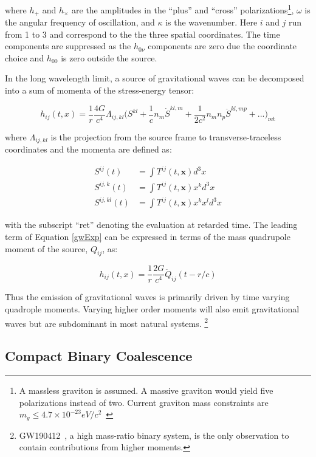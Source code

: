 \documentclass [12pt, proquest]{uwthesis}[2019]
\begin{document}
where $h_+$ and $h_\times$ are the amplitudes in the ``plus'' and ``cross'' polarizations\footnote{A massless graviton is assumed. A massive graviton would yield five polarizations instead of two. Current graviton mass constraints are $m_g\leq 4.7\times 10^{-23} eV/c^2$~\cite{graviton}}, $\omega$ is the angular frequency of oscillation, and $\kappa$ is the wavenumber. Here $i$ and $j$ run from 1 to 3 and correspond to the the three spatial coordinates. The time components are suppressed as the $h_{0\nu}$ components are zero due the coordinate choice and $h_{00}$ is zero outside the source. 

In the long wavelength limit, a source of gravitational waves can be decomposed into a sum of momenta of the stress-energy tensor:

\begin{equation}
h_{ij}(t,x)=\frac{1}{r}\frac{4 G}{c^4} \Lambda_{ij,kl} \bigg( S^{kl} +\frac{1}{c} n_m \dot{S}^{kl,m} +\frac{1}{2c^2} n_m n_p \ddot{S}^{kl,mp}+...\bigg)_\text{ret} \label{gwExp}
\end{equation}

where $\Lambda_{ij,kl}$ is the projection from the source frame to transverse-traceless coordinates and the momenta are defined as:

\begin{align}
S^{ij}(t)&=\int T^{ij}(t,\mathbf{x}) d^3x\\
S^{ij,k}(t)&=\int T^{ij}(t,\mathbf{x}) x^k d^3x\\
S^{ij,kl}(t)&=\int T^{ij}(t,\mathbf{x}) x^k x^l d^3x
\end{align}

with the subscript ``ret'' denoting the evaluation at retarded time. The leading term of Equation \ref{gwExp} can be expressed in terms of the mass quadrupole moment of the source, $Q_{ij}$, as:

\begin{equation}
h_{ij}(t,x)=\frac{1}{r}\frac{2 G}{c^4} \ddot{Q}_{ij}(t-r/c)
\end{equation}

Thus the emission of gravitational waves is primarily driven by time varying quadrople moments. Varying higher order moments will also emit gravitational waves but are subdominant in most natural systems. \footnote{GW190412~\cite{GW190412}, a high mass-ratio binary system, is the only observation to contain contributions from higher moments.}

\subsection{Compact Binary Coalescence}\label{CBC}
\end{document}
